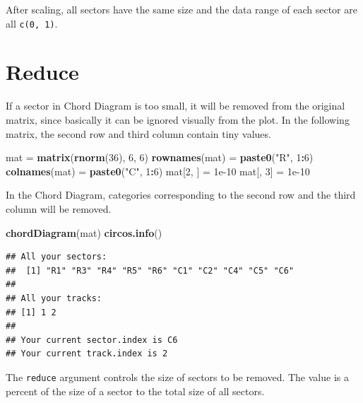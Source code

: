 \documentclass[]{book}
\newenvironment{Shaded}{\begin{snugshade}}{\end{snugshade}}
\newcommand{\KeywordTok}[1]{\textcolor[rgb]{0.13,0.29,0.53}{\textbf{#1}}}
\newcommand{\DecValTok}[1]{\textcolor[rgb]{0.00,0.00,0.81}{#1}}
\newcommand{\FloatTok}[1]{\textcolor[rgb]{0.00,0.00,0.81}{#1}}
\newcommand{\StringTok}[1]{\textcolor[rgb]{0.31,0.60,0.02}{#1}}
\newcommand{\OperatorTok}[1]{\textcolor[rgb]{0.81,0.36,0.00}{\textbf{#1}}}
\newcommand{\NormalTok}[1]{#1}
\begin{document}
After scaling, all sectors have the same size and the data range of each
sector are all \texttt{c(0,\ 1)}.

\section{Reduce}\label{reduce}

If a sector in Chord Diagram is too small, it will be removed from the
original matrix, since basically it can be ignored visually from the
plot. In the following matrix, the second row and third column contain
tiny values.

\begin{Shaded}
\begin{Highlighting}[]
\NormalTok{mat =}\StringTok{ }\KeywordTok{matrix}\NormalTok{(}\KeywordTok{rnorm}\NormalTok{(}\DecValTok{36}\NormalTok{), }\DecValTok{6}\NormalTok{, }\DecValTok{6}\NormalTok{)}
\KeywordTok{rownames}\NormalTok{(mat) =}\StringTok{ }\KeywordTok{paste0}\NormalTok{(}\StringTok{"R"}\NormalTok{, }\DecValTok{1}\OperatorTok{:}\DecValTok{6}\NormalTok{)}
\KeywordTok{colnames}\NormalTok{(mat) =}\StringTok{ }\KeywordTok{paste0}\NormalTok{(}\StringTok{"C"}\NormalTok{, }\DecValTok{1}\OperatorTok{:}\DecValTok{6}\NormalTok{)}
\NormalTok{mat[}\DecValTok{2}\NormalTok{, ] =}\StringTok{ }\FloatTok{1e-10}
\NormalTok{mat[, }\DecValTok{3}\NormalTok{] =}\StringTok{ }\FloatTok{1e-10}
\end{Highlighting}
\end{Shaded}

In the Chord Diagram, categories corresponding to the second row and the
third column will be removed.

\begin{Shaded}
\begin{Highlighting}[]
\KeywordTok{chordDiagram}\NormalTok{(mat)}
\KeywordTok{circos.info}\NormalTok{()}
\end{Highlighting}
\end{Shaded}

\begin{verbatim}
## All your sectors:
##  [1] "R1" "R3" "R4" "R5" "R6" "C1" "C2" "C4" "C5" "C6"
## 
## All your tracks:
## [1] 1 2
## 
## Your current sector.index is C6
## Your current track.index is 2
\end{verbatim}

The \texttt{reduce} argument controls the size of sectors to be removed.
The value is a percent of the size of a sector to the total size of all
sectors.
\end{document}
